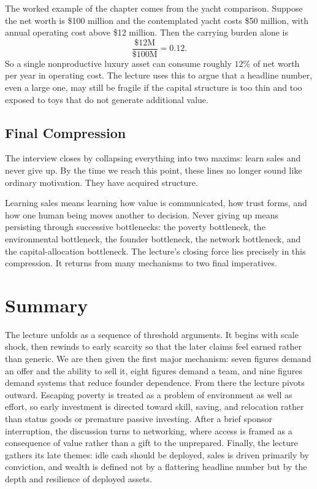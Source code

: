The worked example of the chapter comes from the yacht comparison. Suppose the net worth is \$100 million and the contemplated yacht costs \$50 million, with annual operating cost above \$12 million. Then the carrying burden alone is
\begin{equation}
\frac{\$12\text{M}}{\$100\text{M}}=0.12.
\end{equation}
So a single nonproductive luxury asset can consume roughly \(12\%\) of net worth per year in operating cost. The lecture uses this to argue that a headline number, even a large one, may still be fragile if the capital structure is too thin and too exposed to toys that do not generate additional value.

\subsection{Final Compression}

The interview closes by collapsing everything into two maxims: learn sales and never give up. By the time we reach this point, these lines no longer sound like ordinary motivation. They have acquired structure.

Learning sales means learning how value is communicated, how trust forms, and how one human being moves another to decision. Never giving up means persisting through successive bottlenecks: the poverty bottleneck, the environmental bottleneck, the founder bottleneck, the network bottleneck, and the capital-allocation bottleneck. The lecture's closing force lies precisely in this compression. It returns from many mechanisms to two final imperatives.

\section{Summary}

The lecture unfolds as a sequence of threshold arguments. It begins with scale shock, then rewinds to early scarcity so that the later claims feel earned rather than generic. We are then given the first major mechanism: seven figures demand an offer and the ability to sell it, eight figures demand a team, and nine figures demand systems that reduce founder dependence. From there the lecture pivots outward. Escaping poverty is treated as a problem of environment as well as effort, so early investment is directed toward skill, saving, and relocation rather than status goods or premature passive investing. After a brief sponsor interruption, the discussion turns to networking, where access is framed as a consequence of value rather than a gift to the unprepared. Finally, the lecture gathers its late themes: idle cash should be deployed, sales is driven primarily by conviction, and wealth is defined not by a flattering headline number but by the depth and resilience of deployed assets.


